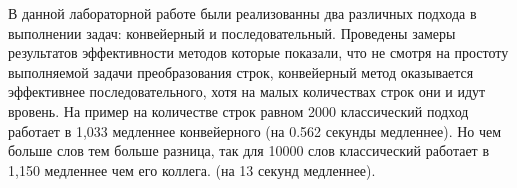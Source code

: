\documentclass[../main.tex]{subfiles}
\begin{document}
	
	В данной лабораторной работе были реализованны два различных подхода в выполнении задач: конвейерный и последовательный.
	Проведены замеры результатов эффективности методов которые показали, что не смотря на простоту выполняемой задачи преобразования строк, конвейерный метод оказывается эффективнее последовательного, хотя на малых количествах строк они и идут вровень. На пример на количестве строк равном 2000 классический подход работает в 1,033 медленнее конвейерного (на 0.562 секунды медленнее). Но чем больше слов тем больше разница, так для 10000 слов классический работает в 1,150 медленнее чем его коллега. (на 13 секунд медленнее).
	
\end{document}
